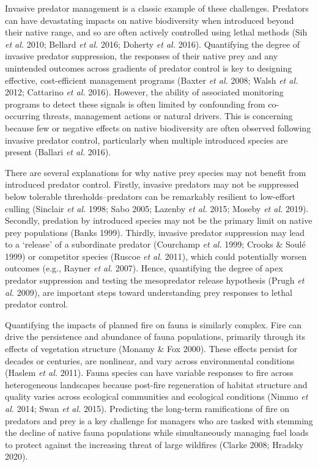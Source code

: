 \documentclass[11pt,a4paper,titlepage,twoside,openright]{style/unimelbthesis}
\begin{document}
\begin{mainmatter}
Invasive predator management is a classic example of these challenges. Predators can have devastating impacts on native biodiversity when introduced beyond their native range, and so are often actively controlled using lethal methods (Sih \emph{et al.} 2010; Bellard \emph{et al.} 2016; Doherty \emph{et al.} 2016). Quantifying the degree of invasive predator suppression, the responses of their native prey and any unintended outcomes across gradients of predator control is key to designing effective, cost-efficient management programs (Baxter \emph{et al.} 2008; Walsh \emph{et al.} 2012; Cattarino \emph{et al.} 2016). However, the ability of associated monitoring programs to detect these signals is often limited by confounding from co-occurring threats, management actions or natural drivers. This is concerning because few or negative effects on native biodiversity are often observed following invasive predator control, particularly when multiple introduced species are present (Ballari \emph{et al.} 2016).

There are several explanations for why native prey species may not benefit from introduced predator control. Firstly, invasive predators may not be suppressed below tolerable thresholds--predators can be remarkably resilient to low-effort culling (Sinclair \emph{et al.} 1998; Sabo 2005; Lazenby \emph{et al.} 2015; Moseby \emph{et al.} 2019). Secondly, predation by introduced species may not be the primary limit on native prey populations (Banks 1999). Thirdly, invasive predator suppression may lead to a `release' of a subordinate predator (Courchamp \emph{et al.} 1999; Crooks \& Soulé 1999) or competitor species (Ruscoe \emph{et al.} 2011), which could potentially worsen outcomes (e.g., Rayner \emph{et al.} 2007). Hence, quantifying the degree of apex predator suppression and testing the mesopredator release hypothesis (Prugh \emph{et al.} 2009), are important steps toward understanding prey responses to lethal predator control.

Quantifying the impacts of planned fire on fauna is similarly complex. Fire can drive the persistence and abundance of fauna populations, primarily through its effects of vegetation structure (Monamy \& Fox 2000). These effects persist for decades or centuries, are nonlinear, and vary across environmental conditions (Haslem \emph{et al.} 2011). Fauna species can have variable responses to fire across heterogeneous landscapes because post-fire regeneration of habitat structure and quality varies across ecological communities and ecological conditions (Nimmo \emph{et al.} 2014; Swan \emph{et al.} 2015). Predicting the long-term ramifications of fire on predators and prey is a key challenge for managers who are tasked with stemming the decline of native fauna populations while simultaneously managing fuel loads to protect against the increasing threat of large wildfires (Clarke 2008; Hradsky 2020).


\end{mainmatter}
\end{document}
